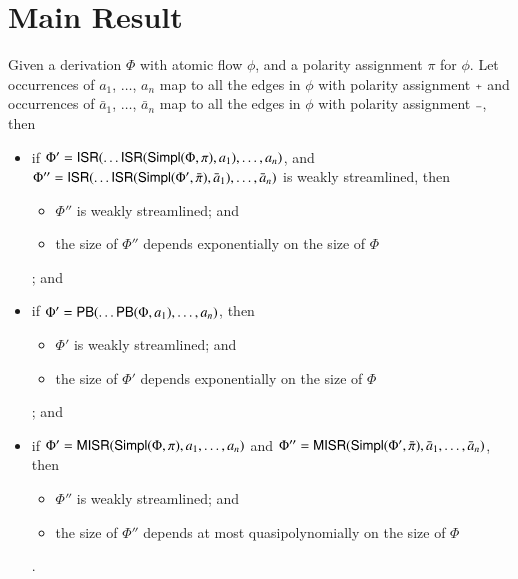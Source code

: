 \chapter{Main Result}\label{chapter:MainResult}

\begin{proposition}
Given a derivation $\Phi$ with atomic flow $\phi$, and a polarity assignment $\pi$ for $\phi$. Let occurrences of $a_1$, $\dots$, $a_n$ map to all the edges in $\phi$ with polarity assignment $\ppl$ and occurrences of $\bar a_1$, $\dots$, $\bar a_n$ map to all the edges in $\phi$ with polarity assignment $\pmi$, then
\begin{itemize}
\item if $\Phi'=\mathsf{ISR}(\dots\mathsf{ISR}(\mathsf{Simpl}(\Phi,\pi),a_1),\dots,a_n)$, and $\Phi''=\mathsf{ISR}(\dots\mathsf{ISR}(\mathsf{Simpl}(\Phi',\bar\pi),\bar a_1),\dots,\bar a_n)$ is weakly streamlined, then
\begin{itemize}
\item $\Phi''$ is weakly streamlined; and
\item the size of $\Phi''$ depends exponentially on the size of $\Phi$
\end{itemize}; and
\item if $\Phi'=\mathsf{PB}(\dots\mathsf{PB}(\Phi,a_1),\dots,a_n)$, then
\begin{itemize}
\item $\Phi'$ is weakly streamlined; and
\item the size of $\Phi'$ depends exponentially on the size of $\Phi$
\end{itemize}; and
\item if $\Phi'=\mathsf{MISR}(\mathsf{Simpl}(\Phi,\pi),a_1,\dots,a_n)$ and $\Phi''=\mathsf{MISR}(\mathsf{Simpl}(\Phi',\bar \pi),\bar a_1,\dots,\bar a_n)$, then
\begin{itemize}
\item $\Phi''$ is weakly streamlined; and
\item the size of $\Phi''$ depends at most quasipolynomially on the size of $\Phi$
\end{itemize}.
\end{itemize}
\end{proposition}